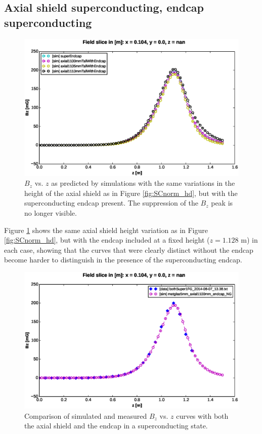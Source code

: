 \documentclass[twocolumn,aps,prb,citeautoscript]{revtex4-1}
\begin{document}
\subsection{Axial shield superconducting, endcap superconducting}

\begin{figure}
    \includegraphics[width=\textwidth]{figures/axial_effect_endcap.eps}
    \caption{\label{fig:SCSC_hd}$B_z$ vs. $z$ as predicted by simulations with the same variations in the height
    of the axial shield as in Figure \ref{fig:SCnorm_hd}, but with the superconducting endcap present. The
    suppression of the $B_z$ peak is no longer visible.}
\end{figure}

Figure \ref{fig:SCSC_hd} shows the same axial shield height variation as in Figure \ref{fig:SCnorm_hd}, but with
the endcap included at a fixed height ($z = 1.128$ m) in each case, showing that the curves that were clearly
distinct without the endcap become harder to distinguish in the presence of the superconducting endcap.

\begin{figure}
    \includegraphics[width=\textwidth]{figures/SCSC_comp.eps}
    \caption{\label{fig:SCSC_comp}Comparison of simulated and measured $B_z$ vs. $z$ curves with both the
    axial shield and the endcap in a superconducting state.}
\end{figure}
\end{document}
